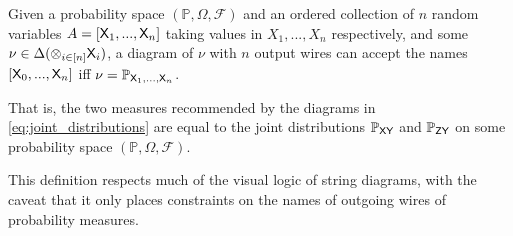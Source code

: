 \begin{definition}\label{def:wire_names_as_RVs}
Given a probability space $(\mathbb{P},\Omega,\mathcal{F})$ and an ordered collection of $n$ random variables $A=[\mathsf{X}_1,...,\mathsf{X}_n]$ taking values in $X_1,...,X_n$ respectively, and some $\nu\in \Delta(\otimes_{i\in[n]} \mathsf{X}_i)$, a diagram of $\nu$ with $n$ output wires can accept the names $[\mathsf{X}_0,...,\mathsf{X}_n]$ iff $\nu = \mathbb{P}_{\mathsf{X}_1,...,\mathsf{X}_n}$. 
\end{definition}

That is, the two measures recommended by the diagrams in \ref{eq:joint_distributions} are equal to the joint distributions $\mathbb{P}_{\mathsf{X}\mathsf{Y}}$ and $\mathbb{P}_{\mathsf{Z}\mathsf{Y}}$ on some probability space $(\mathbb{P},\Omega,\mathcal{F})$.

This definition respects much of the visual logic of string diagrams, with the caveat that it only places constraints on the names of outgoing wires of probability measures.

